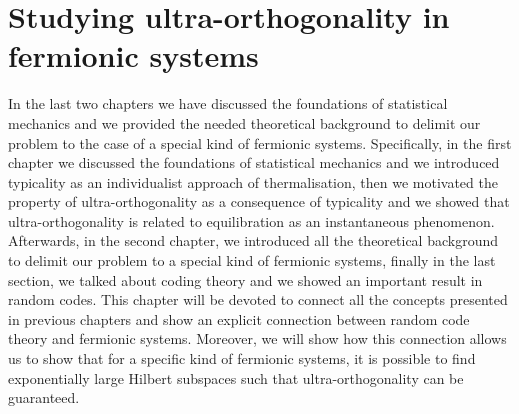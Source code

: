 \chapter{Studying ultra-orthogonality in fermionic systems}
In the last two chapters we have discussed the foundations of statistical mechanics and we provided the needed theoretical background to delimit our problem to the case of a special kind of fermionic systems. Specifically, in the first chapter we discussed the foundations of statistical mechanics and we introduced typicality as an individualist approach of thermalisation, then we motivated the property of ultra-orthogonality as a consequence of typicality and we showed that ultra-orthogonality is related to equilibration as an instantaneous phenomenon. Afterwards, in the second chapter, we introduced all the theoretical background to delimit our problem to a special kind of fermionic systems, finally in the last section, we talked about coding theory and we showed an important result in random codes. This chapter will be devoted to connect all the concepts presented in previous chapters and show an explicit connection between random code theory and fermionic systems. Moreover, we will show how this connection allows us to show that for a specific kind of fermionic systems, it is possible to find exponentially large Hilbert subspaces such that ultra-orthogonality can be guaranteed.
